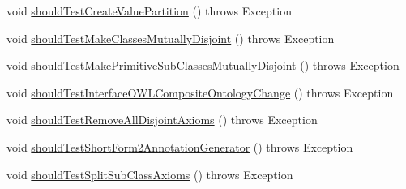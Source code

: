 \begin{DoxyCompactItemize}
void \hyperlink{classorg_1_1semanticweb_1_1owlapi_1_1contract_1_1_contract_owlapi_test_ad85302b28fb7719787b4063b79775081}{should\-Test\-Create\-Value\-Partition} ()  throws Exception 
\item 
void \hyperlink{classorg_1_1semanticweb_1_1owlapi_1_1contract_1_1_contract_owlapi_test_ae64cea86bd8e4f4a34317e5dc79afcc0}{should\-Test\-Make\-Classes\-Mutually\-Disjoint} ()  throws Exception 
\item 
void \hyperlink{classorg_1_1semanticweb_1_1owlapi_1_1contract_1_1_contract_owlapi_test_a3379c5c91fceea4a364f1d27dbbd8eda}{should\-Test\-Make\-Primitive\-Sub\-Classes\-Mutually\-Disjoint} ()  throws Exception 
\item 
void \hyperlink{classorg_1_1semanticweb_1_1owlapi_1_1contract_1_1_contract_owlapi_test_ab9a879c5c85e6c40d4ecca3b2edf6e54}{should\-Test\-Interface\-O\-W\-L\-Composite\-Ontology\-Change} ()  throws Exception 
\item 
void \hyperlink{classorg_1_1semanticweb_1_1owlapi_1_1contract_1_1_contract_owlapi_test_a26940fbdc7253b1a90d91181c644e530}{should\-Test\-Remove\-All\-Disjoint\-Axioms} ()  throws Exception 
\item 
void \hyperlink{classorg_1_1semanticweb_1_1owlapi_1_1contract_1_1_contract_owlapi_test_acdcc0cd244c2cee61513567d4a189d79}{should\-Test\-Short\-Form2\-Annotation\-Generator} ()  throws Exception 
\item 
void \hyperlink{classorg_1_1semanticweb_1_1owlapi_1_1contract_1_1_contract_owlapi_test_a9c19d68ee3f7d3c23139f0fec578498d}{should\-Test\-Split\-Sub\-Class\-Axioms} ()  throws Exception 
\end{DoxyCompactItemize}


